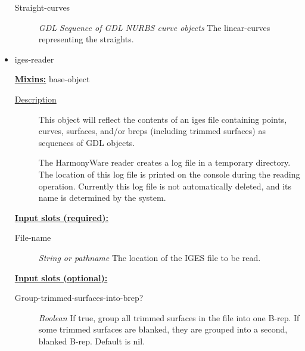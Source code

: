 \documentclass [11pt]{book}
\begin{document}
\begin{itemize}
\begin{description}
\item [Straight-curves]
\emph{GDL Sequence of GDL NURBS curve objects} The linear-curves representing the straights.


\end{description}







\item {}iges-reader


\textbf{
\underline{Mixins:}} base-object





\begin{description}

\item [
\underline{Description}]


This object will reflect the contents of an iges file containing
points, curves, surfaces, and/or breps (including trimmed surfaces) as sequences of GDL objects. 

The HarmonyWare reader creates a log file in a temporary directory. The location of this log
file is printed on the console during the reading operation. Currently this log file is
not automatically deleted, and its name is determined by the system.





\end{description}








\textbf{
\underline{Input slots (required):}}

\begin{description}

\item [File-name]
\emph{String or pathname} The location of the IGES file to be read.


\end{description}






\textbf{
\underline{Input slots (optional):}}

\begin{description}

\item [Group-trimmed-surfaces-into-brep?]
\emph{Boolean} If true, group all trimmed surfaces in the file into one B-rep.
If some trimmed surfaces are blanked, they are grouped into a second, blanked B-rep. Default is nil.



\end{description}
\end{itemize}
\end{document}
